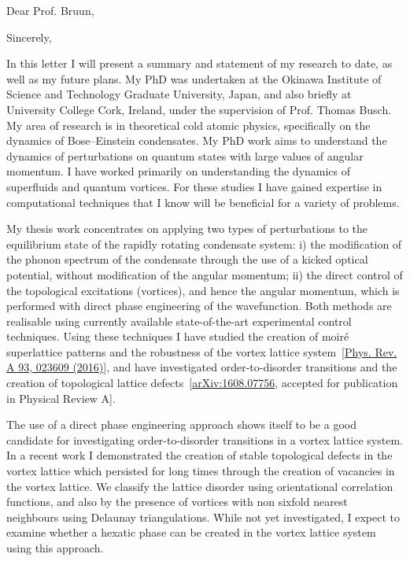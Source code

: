\documentclass[12pt,a4paper,unicode]{moderncv}
\begin{document}
    \opening{Dear Prof. Bruun,}
    \date{\today} %
    \closing{Sincerely,}
    \makelettertitle
{
    In this letter I will present a summary and statement of my research to date, as well as my future plans. My PhD was undertaken at the Okinawa Institute of Science and Technology Graduate University, Japan, and also briefly at University College Cork, Ireland, under the supervision of Prof. Thomas Busch. My area of research is in theoretical cold atomic physics, specifically on the dynamics of Bose--Einstein condensates. My PhD work aims to understand the dynamics of perturbations on quantum states with large values of angular momentum. I have worked primarily on understanding the dynamics of superfluids and quantum vortices. For these studies I have gained expertise in computational techniques that I know will be beneficial for a variety of problems.

    My thesis work concentrates on applying two types of perturbations to the equilibrium state of the rapidly rotating condensate system: i) the modification of the phonon spectrum of the condensate through the use of a kicked optical potential, without modification of the angular momentum; ii) the direct control of the topological excitations (vortices), and hence the angular momentum, which is performed with direct phase engineering of the wavefunction. Both methods are realisable using currently available state-of-the-art experimental control techniques. Using these techniques I have studied the creation of moir\'e superlattice patterns and the robustness of the vortex lattice system~[\href{http://journals.aps.org/pra/abstract/10.1103/PhysRevA.93.023609}{Phys. Rev. A 93, 023609 (2016)}], and have investigated order-to-disorder transitions and the creation of topological lattice defects~[\href{https://arxiv.org/abs/1608.07756}{arXiv:1608.07756}, accepted for publication in Physical Review A].

    The use of a direct phase engineering approach shows itself to be a good candidate for investigating order-to-disorder transitions in a vortex lattice system. In a recent work I demonstrated the creation of stable topological defects in the vortex lattice which persisted for long times through the creation of vacancies in the vortex lattice. We classify the lattice disorder using orientational correlation functions, and also by the presence of vortices with non sixfold nearest neighbours using Delaunay triangulations. While not yet investigated, I expect to examine whether a hexatic phase can be created in the vortex lattice system using this approach.

}
\end{document}

